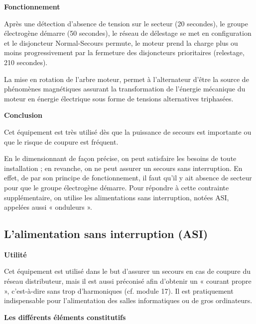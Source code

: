 \vspace{0.3cm}
\textbf{Fonctionnement}
\vspace{0.3cm}

Après une détection d’absence de tension sur le secteur (20 secondes), le groupe électrogène démarre (50 secondes), le réseau de délestage se met en configuration et le disjoncteur Normal-Secours permute, le moteur prend la charge plus ou moins progressivement par la fermeture des disjoncteurs prioritaires (relestage, 210 secondes).
\vspace{0.3cm}

La mise en rotation de l’arbre moteur, permet à l’alternateur d’être la source de phénomènes magnétiques assurant la transformation de l’énergie mécanique du moteur en énergie électrique sous forme de tensions alternatives triphasées.


\vspace{0.3cm}
\textbf{Conclusion}
\vspace{0.3cm}


Cet équipement est très utilisé dès que la puissance de secours est importante ou que le risque de coupure est fréquent. 
\vspace{0.3cm}

En le dimensionnant de façon précise, on peut satisfaire les besoins de toute installation ; en revanche, on ne peut assurer un secours sans interruption. En effet, de par son principe de fonctionnement, il faut qu’il y ait absence de secteur pour que le groupe électrogène démarre.
Pour répondre à cette contrainte supplémentaire, on utilise les alimentations sans interruption, notées ASI, appelées aussi « onduleurs ».



\subsection{L’alimentation sans interruption (ASI)}

\textbf{Utilité}
\vspace{0.3cm}

Cet équipement est utilisé dans le but d’assurer un secours en cas de coupure du réseau distributeur, mais il est aussi préconisé afin d’obtenir un « courant propre », c’est-à-dire sans trop d’harmoniques (cf. module 17). Il est pratiquement indispensable pour l’alimentation des salles informatiques ou de gros ordinateurs.

\newpage
\vspace{0.3cm}
\textbf{Les différents éléments constitutifs}
\vspace{0.3cm}

